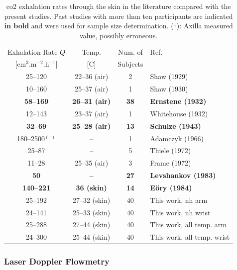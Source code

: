 \def\arraystretch{1.25}
\begin{table}
	\centering
	\begin{tabular}{c|c|c|l}
		Exhalation Rate $Q$ & Temp. & Num. of & Ref. \\
		{[}cm$^{3}$.m$^{-2}$.h$^{-1}$] & [{\degree}C] & Subjects & \\ \hhline{=|=|=|=}
		25--120 		& 22--36 (air)	& 2 & Shaw (1929)\cite{shaw1929} \\ \hline
		10--160 		& 25--37 (air)	 & 1 & Shaw (1930)\cite{shaw1930} \\ \hline
		\textbf{58--169}			& \textbf{26--31 (air)}	& \textbf{38} & \textbf{Ernstene (1932)\cite[Table~1]{ernstene1932a}} \\ \hline
		12--143			& 23--37 (air)		& 1	& Whitehouse (1932)\cite{whitehouse1932} \\ \hline
		\textbf{32--69} & \textbf{25--28 (air)} & \textbf{13} & \textbf{Schulze (1943)\cite[Table~12]{schulze1943}} \\ \hline
		180--2500$^{(\dagger)}$	& -- 	 & 1 & Adamczyk (1966)\cite{adamczyk1966} \\ \hline
		25--87			& -- 				 & 5 & Thiele (1972)\cite{thiele1972} \\ \hline
		11--28 & 25--35 (air) & 3 & Frame (1972)\cite{frame1972} \\ \hline 
		\textbf{50} & \textbf{--} & \textbf{27} & \textbf{Levshankov (1983)\cite{levshankov1983}} \\ \hline
		\textbf{140--221} & \textbf{36 (skin)} & \textbf{14} & \textbf{E{\"o}ry (1984)\cite{eory1984}} \\ \hhline{=|=|=|=}
		25--192 & 27--32 (skin) & 40 & This work, \gls{nh} arm \\ \hline
		24--141 & 25--33 (skin) & 40 & This work, \gls{nh} wrist \\ \hline
		25--288 & 27--44 (skin) & 40 & This work, all temp. arm \\ \hline
		24--300 & 25--44 (skin) & 40 & This work, all temp. wrist
	\end{tabular}	
	\caption[\gls{co2} exhalation rates through the skin in the literature.]{\gls{co2} exhalation rates through the skin in the literature compared with the present studies. Past studies with more than ten participants are indicated \textbf{in bold} and were used for sample size determination. ($\dagger$): Axilla measured value, possibly erroneous.}\label{table:tcco2:diff_rate_lit}
\end{table}

\subsubsection{\texorpdfstring{Laser Doppler Flowmetry}{LDF}}

